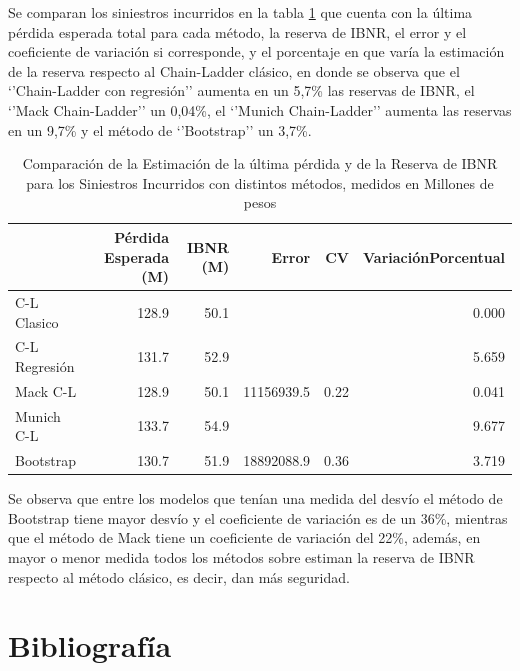 \documentclass[
  12pt,
]{article}
\begin{document}
Se comparan los siniestros incurridos en la tabla \ref{Comparaciones1}
que cuenta con la última pérdida esperada total para cada método, la
reserva de IBNR, el error y el coeficiente de variación si corresponde,
y el porcentaje en que varía la estimación de la reserva respecto al
Chain-Ladder clásico, en donde se observa que el `'Chain-Ladder con
regresión'' aumenta en un 5,7\% las reservas de IBNR, el `'Mack
Chain-Ladder'' un 0,04\%, el `'Munich Chain-Ladder'' aumenta las
reservas en un 9,7\% y el método de `'Bootstrap'' un 3,7\%.

\begin{table}[ht]
\centering
\caption{Comparación de la Estimación de la última pérdida y de la Reserva de IBNR para los Siniestros Incurridos con distintos métodos, medidos en Millones de pesos} 
\label{Comparaciones1}
\begin{tabular}{lrrrrr}
  \hline
 & Pérdida Esperada (M) & IBNR (M) & Error & CV & VariaciónPorcentual \\ 
  \hline
C-L Clasico & 128.9 & 50.1 &  &  & 0.000 \\ 
  C-L Regresión & 131.7 & 52.9 &  &  & 5.659 \\ 
  Mack C-L & 128.9 & 50.1 & 11156939.5 & 0.22 & 0.041 \\ 
  Munich C-L & 133.7 & 54.9 &  &  & 9.677 \\ 
  Bootstrap & 130.7 & 51.9 & 18892088.9 & 0.36 & 3.719 \\ 
   \hline
\end{tabular}
\end{table}

Se observa que entre los modelos que tenían una medida del desvío el
método de Bootstrap tiene mayor desvío y el coeficiente de variación es
de un 36\%, mientras que el método de Mack tiene un coeficiente de
variación del 22\%, además, en mayor o menor medida todos los métodos
sobre estiman la reserva de IBNR respecto al método clásico, es decir,
dan más seguridad.

\newpage

\section*{Bibliografía}\label{bib}
\end{document}
